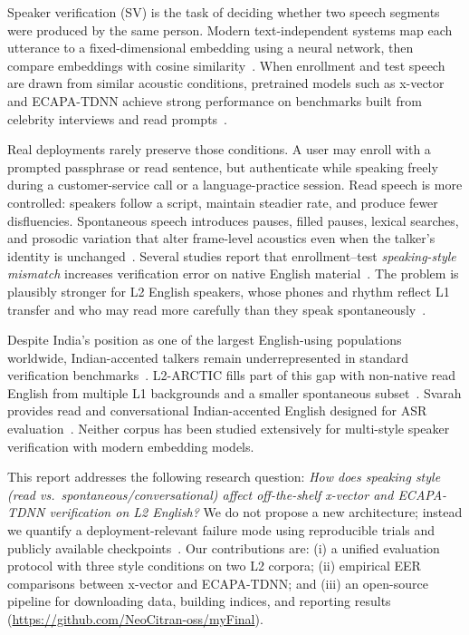 \documentclass[cameraready]{Interspeech}
\begin{document}
Speaker verification (SV) is the task of deciding whether two speech segments were produced by the same person. Modern text-independent systems map each utterance to a fixed-dimensional embedding using a neural network, then compare embeddings with cosine similarity~\cite{snyder2018xvector,desplanques2020ecapa}. When enrollment and test speech are drawn from similar acoustic conditions, pretrained models such as x-vector and ECAPA-TDNN achieve strong performance on benchmarks built from celebrity interviews and read prompts~\cite{chung2018voxceleb,desplanques2020ecapa}.

Real deployments rarely preserve those conditions. A user may enroll with a prompted passphrase or read sentence, but authenticate while speaking freely during a customer-service call or a language-practice session. Read speech is more controlled: speakers follow a script, maintain steadier rate, and produce fewer disfluencies. Spontaneous speech introduces pauses, filled pauses, lexical searches, and prosodic variation that alter frame-level acoustics even when the talker's identity is unchanged~\cite{kenny2014style}. Several studies report that enrollment--test \emph{speaking-style mismatch} increases verification error on native English material~\cite{tom2010style,afshan2015style,wang2020crossstyle}. The problem is plausibly stronger for L2 English speakers, whose phones and rhythm reflect L1 transfer and who may read more carefully than they speak spontaneously~\cite{zhao2018l2arctic}.

Despite India's position as one of the largest English-using populations worldwide, Indian-accented talkers remain underrepresented in standard verification benchmarks~\cite{javed2023svarah}. L2-ARCTIC fills part of this gap with non-native read English from multiple L1 backgrounds and a smaller spontaneous subset~\cite{zhao2018l2arctic}. Svarah provides read and conversational Indian-accented English designed for ASR evaluation~\cite{javed2023svarah}. Neither corpus has been studied extensively for multi-style speaker verification with modern embedding models.

This report addresses the following research question: \emph{How does speaking style (read vs.\ spontaneous/conversational) affect off-the-shelf x-vector and ECAPA-TDNN verification on L2 English?} We do not propose a new architecture; instead we quantify a deployment-relevant failure mode using reproducible trials and publicly available checkpoints~\cite{ravanelli2021speechbrain}. Our contributions are: (i) a unified evaluation protocol with three style conditions on two L2 corpora; (ii) empirical EER comparisons between x-vector and ECAPA-TDNN; and (iii) an open-source pipeline for downloading data, building indices, and reporting results (\url{https://github.com/NeoCitran-oss/myFinal}).
\end{document}
